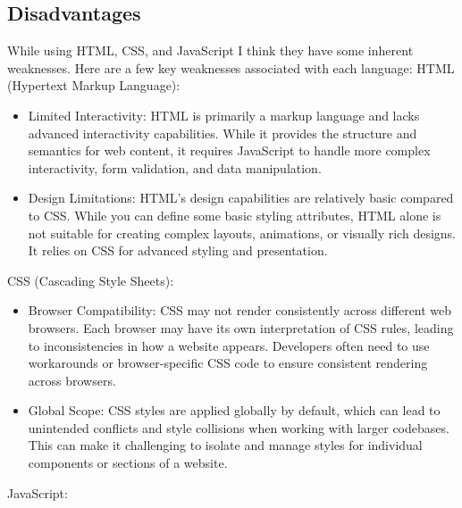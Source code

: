 \documentclass{article}
\begin{document}
\subsection{Disadvantages}
While using HTML, CSS, and JavaScript I think they have some inherent weaknesses. Here are a few key weaknesses associated with each language:
HTML (Hypertext Markup Language):
\begin{itemize}
\item	Limited Interactivity: HTML is primarily a markup language and lacks advanced interactivity capabilities. While it provides the structure and semantics for web content, it requires JavaScript to handle more complex interactivity, form validation, and data manipulation.
\item	Design Limitations: HTML's design capabilities are relatively basic compared to CSS. While you can define some basic styling attributes, HTML alone is not suitable for creating complex layouts, animations, or visually rich designs. It relies on CSS for advanced styling and presentation.
\end{itemize}
CSS (Cascading Style Sheets):
\begin{itemize}
\item	Browser Compatibility: CSS may not render consistently across different web browsers. Each browser may have its own interpretation of CSS rules, leading to inconsistencies in how a website appears. Developers often need to use workarounds or browser-specific CSS code to ensure consistent rendering across browsers.
\item	Global Scope: CSS styles are applied globally by default, which can lead to unintended conflicts and style collisions when working with larger codebases. This can make it challenging to isolate and manage styles for individual components or sections of a website.
\end{itemize}
JavaScript:
\end{document}
